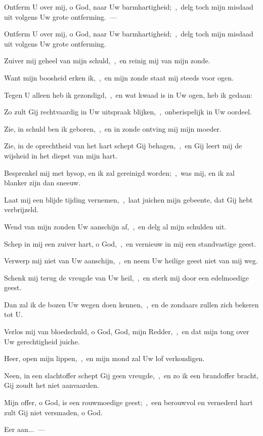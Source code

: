 \documentclass[12pt,twoside,a5paper]{article}
\begin{document}
\begin{halfparskip}
   Ontferm U over mij, o God, naar Uw barmhartigheid;~\sep\ delg toch mijn misdaad uit volgens Uw grote ontferming.~--- 

  Ontferm U over mij, o God, naar Uw barmhartigheid;~\sep\ delg toch mijn misdaad uit volgens Uw grote ontferming.

  Zuiver mij geheel van mijn schuld,~\sep\ en reinig mij van mijn zonde.

  Want mijn boosheid erken ik,~\sep\ en mijn zonde staat mij steeds voor ogen.

  Tegen U alleen heb ik gezondigd,~\sep\ en wat kwaad is in Uw ogen, heb ik gedaan:

  Zo zult Gij rechtvaardig in Uw uitspraak blijken,~\sep\ onberispelijk in Uw oordeel.

  Zie, in schuld ben ik geboren,~\sep\ en in zonde ontving mij mijn moeder.

  Zie, in de oprechtheid van het hart schept Gij behagen,~\sep\ en Gij leert mij de wijsheid in het diepst van mijn hart.

  Besprenkel mij met hysop, en ik zal gereinigd worden;~\sep\ was mij, en ik zal blanker zijn dan sneeuw.

  Laat mij een blijde tijding vernemen,~\sep\ laat juichen mijn gebeente, dat Gij hebt verbrijzeld.

  Wend van mijn zonden Uw aanschijn af,~\sep\ en delg al mijn schulden uit.

  Schep in mij een zuiver hart, o God,~\sep\ en vernieuw in mij een standvastige geest.

  Verwerp mij niet van Uw aanschijn,~\sep\ en neem Uw heilige geest niet van mij weg.

  Schenk mij terug de vreugde van Uw heil,~\sep\ en sterk mij door een edelmoedige geest.

  Dan zal ik de bozen Uw wegen doen kennen,~\sep\ en de zondaars zullen zich bekeren tot U.

  Verlos mij van bloedschuld, o God, God, mijn Redder,~\sep\ en dat mijn tong over Uw gerechtigheid juiche.

  Heer, open mijn lippen,~\sep\ en mijn mond zal Uw lof verkondigen.

  Neen, in een slachtoffer schept Gij geen vreugde,~\sep\ en zo ik een brandoffer bracht, Gij zoudt het niet aanvaarden.

  Mijn offer, o God, is een rouwmoedige geest;~\sep\ een berouwvol en vernederd hart zult Gij niet versmaden, o God.

  Eer aan...~--- 
\end{halfparskip}
\end{document}
